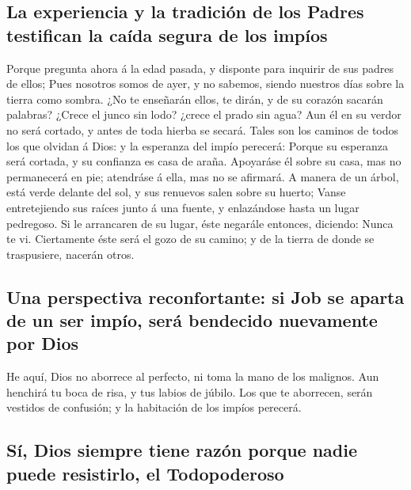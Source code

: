 \hypertarget{la-experiencia-y-la-tradiciuxf3n-de-los-padres-testifican-la-cauxedda-segura-de-los-impuxedos}{%
\subsection{La experiencia y la tradición de los Padres testifican la
caída segura de los
impíos}\label{la-experiencia-y-la-tradiciuxf3n-de-los-padres-testifican-la-cauxedda-segura-de-los-impuxedos}}

 Porque pregunta ahora á la edad pasada, y disponte para
inquirir de sus padres de ellos;  Pues nosotros somos de
ayer, y no sabemos, siendo nuestros días sobre la tierra como sombra.
 ¿No te enseñarán ellos, te dirán, y de su corazón sacarán
palabras?  ¿Crece el junco sin lodo? ¿crece el prado sin
agua?  Aun él en su verdor no será cortado, y antes de toda
hierba se secará.  Tales son los caminos de todos los que
olvidan á Dios: y la esperanza del impío perecerá:  Porque
su esperanza será cortada, y su confianza es casa de araña.
 Apoyaráse él sobre su casa, mas no permanecerá en pie;
atendráse á ella, mas no se afirmará.  A manera de un
árbol, está verde delante del sol, y sus renuevos salen sobre su huerto;
 Vanse entretejiendo sus raíces junto á una fuente, y
enlazándose hasta un lugar pedregoso.  Si le arrancaren de
su lugar, éste negarále entonces, diciendo: Nunca te vi. 
Ciertamente éste será el gozo de su camino; y de la tierra de donde se
traspusiere, nacerán otros.

\hypertarget{una-perspectiva-reconfortante-si-job-se-aparta-de-un-ser-impuxedo-seruxe1-bendecido-nuevamente-por-dios}{%
\subsection{Una perspectiva reconfortante: si Job se aparta de un ser
impío, será bendecido nuevamente por
Dios}\label{una-perspectiva-reconfortante-si-job-se-aparta-de-un-ser-impuxedo-seruxe1-bendecido-nuevamente-por-dios}}

 He aquí, Dios no aborrece al perfecto, ni toma la mano de
los malignos.  Aun henchirá tu boca de risa, y tus labios
de júbilo.  Los que te aborrecen, serán vestidos de
confusión; y la habitación de los impíos perecerá.

\hypertarget{suxed-dios-siempre-tiene-razuxf3n-porque-nadie-puede-resistirlo-el-todopoderoso}{%
\subsection{Sí, Dios siempre tiene razón porque nadie puede resistirlo,
el
Todopoderoso}\label{suxed-dios-siempre-tiene-razuxf3n-porque-nadie-puede-resistirlo-el-todopoderoso}}

